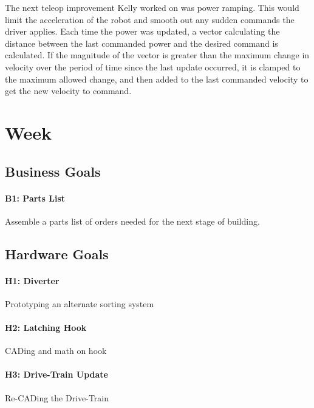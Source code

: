 \documentclass{article}
\begin{document}
The next teleop improvement Kelly worked on was power ramping. This would limit the acceleration of the robot and smooth out any sudden commands the driver applies. Each time the power was updated, a vector calculating the distance between the last commanded power and the desired command is calculated. If the magnitude of the vector is greater than the maximum change in velocity over the period of time since the last update occurred, it is clamped to the maximum allowed change, and then added to the last commanded velocity to get the new velocity to command. 
\clearpage \newpage \section{Week \thesection} 
\subsection{Business Goals}
\paragraph{B1: Parts List}
 Assemble a parts list of orders needed for the next stage of building.
\subsection{Hardware Goals}
\paragraph{H1: Diverter}
Prototyping an alternate sorting system
\paragraph{H2: Latching Hook}
 CADing and math on hook
\paragraph{H3: Drive-Train Update}
 Re-CADing the Drive-Train
\end{document}
